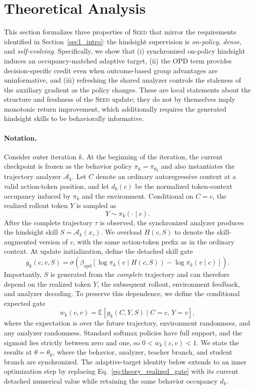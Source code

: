 \section{Theoretical Analysis}
\label{app:theory}
This section formalizes three properties of \textsc{Seed} that mirror the requirements identified in Section~\ref{sec1_intro}: the hindsight supervision is \emph{on-policy}, \emph{dense}, and \emph{self-evolving}. Specifically, we show that (i) synchronized on-policy hindsight induces an occupancy-matched adaptive target, (ii) the OPD term provides decision-specific credit even when outcome-based group advantages are uninformative, and (iii) refreshing the shared analyzer controls the staleness of the auxiliary gradient as the policy changes. These are local statements about the structure and freshness of the \textsc{Seed} update; they do not by themselves imply monotonic return improvement, which additionally requires the generated hindsight skills to be behaviorally informative.

\paragraph{Notation.}
Consider outer iteration $k$. At the beginning of the iteration, the current checkpoint is frozen as the behavior policy
$\pi_k=\pi_{\theta_k}$
and also instantiates the trajectory analyzer $\mathcal A_k$. Let $C$ denote an ordinary autoregressive context at a valid action-token position, and let $d_k(c)$ be the normalized token-context occupancy induced by $\pi_k$ and the environment. Conditional on $C=c$, the realized rollout token $Y$ is sampled as
\[
Y\sim\pi_k(\cdot\mid c).
\]
After the complete trajectory $\tau$ is observed, the synchronized analyzer produces the hindsight skill
$S=\mathcal A_k(x_\tau)$.
We overload $H(c,S)$ to denote the skill-augmented version of $c$, with the same action-token prefix as in the ordinary context. At update initialization, define the detached skill gate
\begin{equation}
 g_k(c,v,S)
 =
 \sigma\!\left(
 \beta_{\mathrm{opd}}
 \left[
 \log\pi_k(v\mid H(c,S))
 -
 \log\pi_k(v\mid c)
 \right]
 \right).
 \label{eq:theory_realized_gate}
\end{equation}
Importantly, $S$ is generated from the \emph{complete} trajectory and can therefore depend on the realized token $Y$, the subsequent rollout, environment feedback, and analyzer decoding. To preserve this dependence, we define the conditional expected gate
\begin{equation}
 w_k(c,v)
 =
 \mathbb E\!\left[
 g_k(C,Y,S)
 \mid C=c,\,Y=v
 \right],
 \label{eq:conditional_expected_gate}
\end{equation}
where the expectation is over the future trajectory, environment randomness, and any analyzer randomness. Standard softmax policies have full support, and the sigmoid lies strictly between zero and one, so $0<w_k(c,v)<1$. We state the results at $\theta=\theta_k$, where the behavior, analyzer, teacher branch, and student branch are synchronized. The adaptive-target identity below extends to an inner optimization step by replacing Eq.~\ref{eq:theory_realized_gate} with its current detached numerical value while retaining the same behavior occupancy $d_k$.

